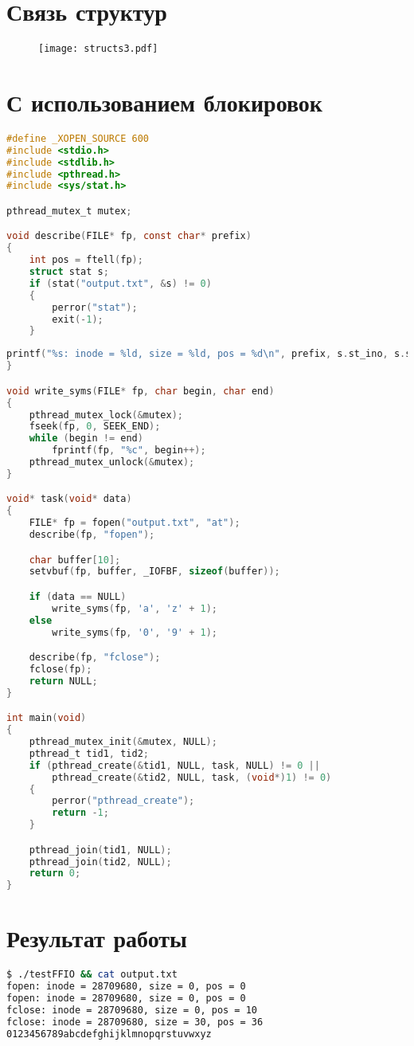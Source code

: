 \clearpage

\section*{Связь структур}

\begin{figure}
    \centering
    \texttt{[image: structs3.pdf]}
\end{figure}

\section*{С использованием блокировок}

\begin{lstlisting}[language=C]
#define _XOPEN_SOURCE 600
#include <stdio.h>
#include <stdlib.h>
#include <pthread.h>
#include <sys/stat.h>

pthread_mutex_t mutex;

void describe(FILE* fp, const char* prefix)
{
    int pos = ftell(fp);
    struct stat s;
    if (stat("output.txt", &s) != 0)
    {
        perror("stat");
        exit(-1);
    }
\end{lstlisting}

\begin{lstlisting}[language=C,firstnumber=18]
    printf("%s: inode = %ld, size = %ld, pos = %d\n", prefix, s.st_ino, s.st_size, pos);
}

void write_syms(FILE* fp, char begin, char end)
{
    pthread_mutex_lock(&mutex);
    fseek(fp, 0, SEEK_END);
    while (begin != end)
        fprintf(fp, "%c", begin++);
    pthread_mutex_unlock(&mutex);
}

void* task(void* data)
{
    FILE* fp = fopen("output.txt", "at");
    describe(fp, "fopen");

    char buffer[10];
    setvbuf(fp, buffer, _IOFBF, sizeof(buffer));

    if (data == NULL)
        write_syms(fp, 'a', 'z' + 1);
    else
        write_syms(fp, '0', '9' + 1);

    describe(fp, "fclose");
    fclose(fp);
    return NULL;
}

int main(void)
{
    pthread_mutex_init(&mutex, NULL);
    pthread_t tid1, tid2;
    if (pthread_create(&tid1, NULL, task, NULL) != 0 ||
        pthread_create(&tid2, NULL, task, (void*)1) != 0)
    {
        perror("pthread_create");
        return -1;
    }

    pthread_join(tid1, NULL);
    pthread_join(tid2, NULL);
    return 0;
}    
\end{lstlisting}

\section*{Результат работы}

\begin{lstlisting}[language=Bash]
$ ./testFFIO && cat output.txt
fopen: inode = 28709680, size = 0, pos = 0
fopen: inode = 28709680, size = 0, pos = 0
fclose: inode = 28709680, size = 0, pos = 10
fclose: inode = 28709680, size = 30, pos = 36
0123456789abcdefghijklmnopqrstuvwxyz    
\end{lstlisting}
